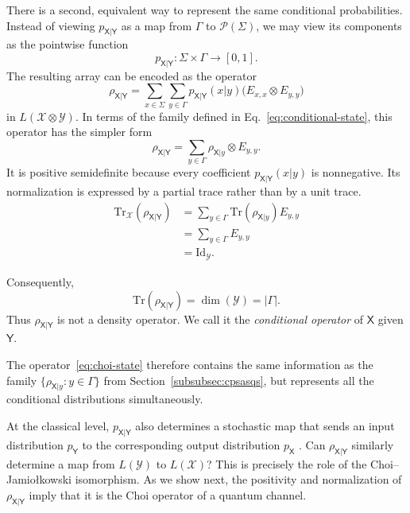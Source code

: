 \documentclass[
    aps,
    pra,
    reprint,
    superscriptaddress,
    nofootinbib
]{revtex4-2}
\theoremstyle{definition}
\theoremstyle{plain}
\begin{document}
There is a second, equivalent way to represent the same conditional
probabilities. Instead of viewing
$p_{\mathsf{X}|\mathsf{Y}}$ as a map from $\Gamma$ to
$\mathcal{P}(\Sigma)$, we may view its components as the pointwise function
\begin{equation}
    p_{\mathsf{X}|\mathsf{Y}}:
    \Sigma\times\Gamma\to[0,1].
\end{equation}
The resulting array can be encoded as the operator
\begin{equation}
    \rho_{\mathsf{X}|\mathsf{Y}}
    =
    \sum_{x\in\Sigma}\sum_{y\in\Gamma}
    p_{\mathsf{X}|\mathsf{Y}}(x|y)
    \bigl(E_{x,x}\otimes E_{y,y}\bigr)
    \label{eq:choi-state}
\end{equation}
in $L(\mathcal{X}\otimes\mathcal{Y})$. In terms of the family defined in
Eq.~\eqref{eq:conditional-state}, this operator has the simpler form
\begin{equation}
    \rho_{\mathsf{X}|\mathsf{Y}}
    =
    \sum_{y\in\Gamma}
    \rho_{\mathsf{X}|y}\otimes E_{y,y}.
\end{equation}
It is positive semidefinite because every coefficient
$p_{\mathsf{X}|\mathsf{Y}}(x|y)$ is nonnegative. Its normalization is
expressed by a partial trace rather than by a unit trace.
\begin{align}
    \mathrm{Tr}_{\mathcal{X}}
    (\rho_{\mathsf{X}|\mathsf{Y}})
    &=
    \sum_{y\in\Gamma}
    \mathrm{Tr}(\rho_{\mathsf{X}|y})E_{y,y}\\
    &=\sum_{y \in\Gamma}E_{y,y} \\
    &=
    \mathrm{Id}_{\mathcal{Y}}.
\end{align}

Consequently,
\begin{equation}
    \mathrm{Tr}(\rho_{\mathsf{X}|\mathsf{Y}})
    =
    \dim(\mathcal{Y})
    =
    \lvert\Gamma\rvert.
\end{equation}
Thus $\rho_{\mathsf{X}|\mathsf{Y}}$ is not a density operator. We call it
the \emph{conditional operator} of $\mathsf{X}$ given $\mathsf{Y}$.

The operator~\eqref{eq:choi-state} therefore contains the same information
as the family
$\{\rho_{\mathsf{X}|y}:y\in\Gamma\}$ from
Section~\ref{subsubsec:cpsasqs}, but represents all the conditional
distributions simultaneously.

At the classical level, $p_{\mathsf{X}|\mathsf{Y}}$ also determines a
stochastic map that sends an input distribution $p_{\mathsf{Y}}$ to the
corresponding output distribution $p_{\mathsf{X}}$
\cite[Sec.~``Probability Theory'']{Leifer2011CJ}. Can
$\rho_{\mathsf{X}|\mathsf{Y}}$ similarly determine a map from
$L(\mathcal{Y})$ to $L(\mathcal{X})$? This is precisely the role of the
Choi--Jamio{\l}kowski isomorphism. As we show next, the positivity and
normalization of $\rho_{\mathsf{X}|\mathsf{Y}}$ imply that it is the Choi
operator of a quantum channel.
\end{document}
